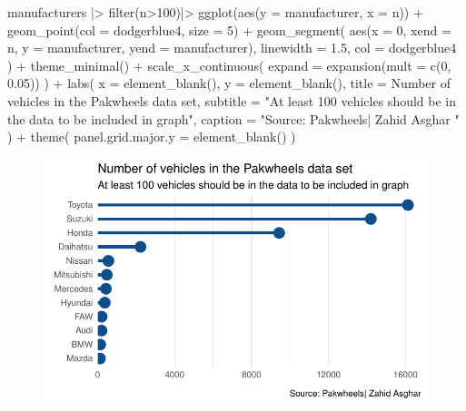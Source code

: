 \documentclass[
  letterpaper,
  DIV=11,
  numbers=noendperiod]{scrartcl}
\newenvironment{Shaded}{\begin{snugshade}}{\end{snugshade}}
\newcommand{\AttributeTok}[1]{\textcolor[rgb]{0.40,0.45,0.13}{#1}}
\newcommand{\DecValTok}[1]{\textcolor[rgb]{0.68,0.00,0.00}{#1}}
\newcommand{\FloatTok}[1]{\textcolor[rgb]{0.68,0.00,0.00}{#1}}
\newcommand{\FunctionTok}[1]{\textcolor[rgb]{0.28,0.35,0.67}{#1}}
\newcommand{\NormalTok}[1]{\textcolor[rgb]{0.00,0.23,0.31}{#1}}
\newcommand{\SpecialCharTok}[1]{\textcolor[rgb]{0.37,0.37,0.37}{#1}}
\newcommand{\StringTok}[1]{\textcolor[rgb]{0.13,0.47,0.30}{#1}}
\begin{document}
\begin{Shaded}
\begin{Highlighting}[]
\NormalTok{manufacturers }\SpecialCharTok{|\textgreater{}} \FunctionTok{filter}\NormalTok{(n}\SpecialCharTok{\textgreater{}}\DecValTok{100}\NormalTok{)}\SpecialCharTok{|\textgreater{}}
  \FunctionTok{ggplot}\NormalTok{(}\FunctionTok{aes}\NormalTok{(}\AttributeTok{y =}\NormalTok{ manufacturer, }\AttributeTok{x =}\NormalTok{ n)) }\SpecialCharTok{+}
  \FunctionTok{geom\_point}\NormalTok{(}\AttributeTok{col =} \StringTok{\textquotesingle{}dodgerblue4\textquotesingle{}}\NormalTok{, }\AttributeTok{size =} \DecValTok{5}\NormalTok{) }\SpecialCharTok{+}
  \FunctionTok{geom\_segment}\NormalTok{(}
    \FunctionTok{aes}\NormalTok{(}\AttributeTok{x =} \DecValTok{0}\NormalTok{, }\AttributeTok{xend =}\NormalTok{ n, }\AttributeTok{y =}\NormalTok{ manufacturer, }\AttributeTok{yend =}\NormalTok{ manufacturer),}
    \AttributeTok{linewidth =} \FloatTok{1.5}\NormalTok{,}
    \AttributeTok{col =} \StringTok{\textquotesingle{}dodgerblue4\textquotesingle{}}
\NormalTok{  ) }\SpecialCharTok{+}
  \FunctionTok{theme\_minimal}\NormalTok{() }\SpecialCharTok{+}
  \FunctionTok{scale\_x\_continuous}\NormalTok{(}
    \AttributeTok{expand =} \FunctionTok{expansion}\NormalTok{(}\AttributeTok{mult =} \FunctionTok{c}\NormalTok{(}\DecValTok{0}\NormalTok{, }\FloatTok{0.05}\NormalTok{))}
\NormalTok{  ) }\SpecialCharTok{+}
  \FunctionTok{labs}\NormalTok{(}
    \AttributeTok{x =} \FunctionTok{element\_blank}\NormalTok{(), }
    \AttributeTok{y =} \FunctionTok{element\_blank}\NormalTok{(),}
    \AttributeTok{title =} \StringTok{\textquotesingle{}Number of vehicles in the Pakwheels data set\textquotesingle{}}\NormalTok{,}
    \AttributeTok{subtitle =} \StringTok{"At least 100 vehicles should be in the data to be included in graph"}\NormalTok{,}
    \AttributeTok{caption =} \StringTok{"Source: Pakwheels| Zahid Asghar "}
\NormalTok{  ) }\SpecialCharTok{+}
  \FunctionTok{theme}\NormalTok{(}
    \AttributeTok{panel.grid.major.y =} \FunctionTok{element\_blank}\NormalTok{()}
\NormalTok{  )}
\end{Highlighting}
\end{Shaded}

\begin{figure}[H]

{\centering \includegraphics[width=17.1875in,height=\textheight]{pakwheels_files/figure-pdf/unnamed-chunk-37-1.pdf}

}

\end{figure}
\end{document}
